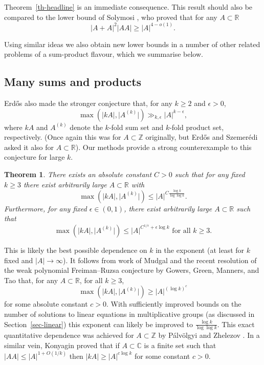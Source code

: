 \documentclass{amsart}
\numberwithin{equation}{section}
\newcommand{\bbz}{\mathbb{Z}}
\newcommand{\abs}[1]{\mathopen{}\left| #1\mathclose{}\right|}
\newcommand{\bbr}{\mathbb{R}}
\newcommand{\bbc}{\mathbb{C}}
\newcommand{\Abs}[1]{\lvert #1\rvert}
\newtheorem{theorem}{Theorem}[section]
\begin{document}
Theorem~\ref{th-headline} is an immediate consequence. This result should also be compared to the lower bound of Solymosi \cite{So09}, who proved that for any $A\subset \bbr$
\begin{equation}\label{eq-sol}
\abs{A+A}^2\abs{AA}\geq \abs{A}^{4-o(1)}.
\end{equation}

Using similar ideas we also obtain new lower bounds in a number of other related problems of a sum-product flavour, which we summarise below.

\subsection{Many sums and products}
Erd\H{o}s \cite{Er77} also made the stronger conjecture that, for any $k\geq 2$ and $\epsilon>0$,
\[\max(\abs{kA},\Abs{A^{(k)}}) \gg_{k,\epsilon}\abs{A}^{k-\epsilon},\]
where $kA$ and $A^{(k)}$ denote the $k$-fold sum set and $k$-fold product set, respectively. (Once again this was for $A\subset \bbz$ originally, but Erd\H{o}s and Szemer\'{e}di \cite{ErSz83} asked it also for $A\subset \bbr$). Our methods provide a strong counterexample to this conjecture for large $k$.
\begin{theorem}\label{th-mainmult} 
There exists an absolute constant $C>0$ such that for any fixed $k\geq 3$ there exist arbitrarily large $A\subset \bbr$ with
\[\max(\abs{kA},\Abs{A^{(k)}})\leq \abs{A}^{C\frac{\log k}{\log\log k}}.\]
Furthermore, for any fixed $\epsilon\in (0,1)$, there exist arbitrarily large $A\subset \bbr$ such that
\[\max(\abs{kA},\Abs{A^{(k)}})\leq \abs{A}^{C^{1/\epsilon}+\epsilon \log k}\textrm{ for all }k\geq 3.\]
\end{theorem}
This is likely the best possible dependence on $k$ in the exponent (at least for $k$ fixed and $\abs{A}\to \infty$). It follows from work of Mudgal \cite{Mu24} and the recent resolution of the weak polynomial Freiman--Ruzsa conjecture by Gowers, Green, Manners, and Tao \cite{GGMT25} that, for any $A\subset \bbr$, for all $k\geq 3$,
\[\max(\abs{kA},\Abs{A^{(k)}})\geq\abs{A}^{(\log k)^c}\]
for some absolute constant $c>0$. With sufficiently improved bounds on the number of solutions to linear equations in multiplicative groups (as discussed in Section~\ref{sec-linear}) this exponent can likely be improved to $\frac{\log k}{\log\log k}$. This exact quantitative dependence was achieved for $A\subset \bbz$ by P\'{a}lv\"{o}lgyi and Zhelezov \cite{PaZh21}. In a similar vein, Konyagin \cite{Ko14} proved that if $A\subset \bbc$ is a finite set such that $\abs{AA}\leq \abs{A}^{1+O(1/k)}$ then $\abs{kA}\geq \abs{A}^{c\log k}$ for some constant $c>0$. 
\end{document}
